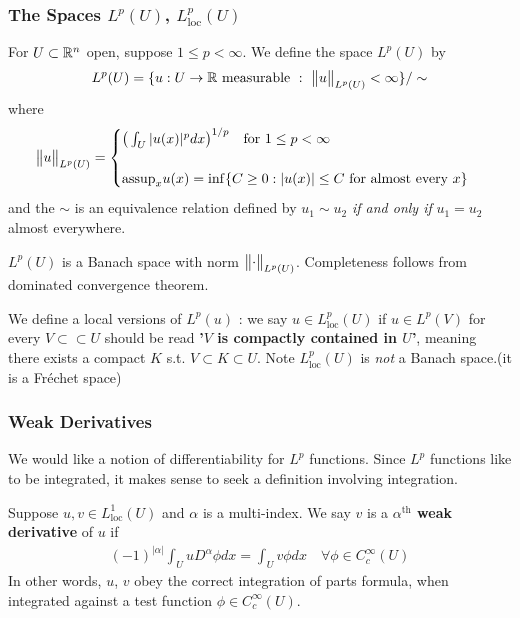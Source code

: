 \documentclass[10pt,a4paper]{report}
\begin{document}
\subsubsection*{The Spaces $L^p(U)$, $L^p_{\text{loc}}(U)$}

For $U\subset\mathbb{R}^n$ open, suppose $1\leq p<\infty$. We define the space $L^p(U)$ by
\begin{align*}
L^p(U) = \{ u:U\rightarrow \mathbb{R} \text{ measurable} \,\, : \,\, \bigl\lVert u\bigr\rVert_{L^p(U)} <\infty \} / \sim
\end{align*}
where
\begin{align*}
\bigl\lVert u\bigr\rVert_{L^p(U)} = \begin{cases}
\big( \int_{U} |u(x)|^p dx \big)^{1/p} \quad \text{for } 1\leq p <\infty \\
\\
\text{assup}_x u(x) = \inf \{C\geq 0 : |u(x)| \leq C \text{ for almost every } x \}
\end{cases}
\end{align*}
and the $\sim$ is an equivalence relation defined by $u_1 \sim u_2$ \emph{if and only if} $u_1 = u_2$ almost everywhere.

$L^p(U)$ is a Banach space with norm $\bigl\lVert\cdot\bigr\rVert_{L^p(U)}$. Completeness follows from dominated convergence theorem.
\s

We define a local versions of $L^p(u)$ : we say $u\in L^p_{\text{loc}}(U)$ if $u\in L^p(V)$ for every $V \subset\subset U$ should be read \textbf{'$V$ is compactly contained in $U$'}, meaning there exists a compact $K$ s.t. $V\subset K \subset U$. Note $L^p_{\text{loc}}(U)$ is \emph{not} a Banach space.(it is a Fr\'{e}chet space)

\subsubsection*{Weak Derivatives}

We would like a notion of differentiability for $L^p$ functions. Since $L^p$ functions like to be integrated, it makes sense to seek a definition involving integration.
\s

 Suppose $u,v\in L^1_{\text{loc}}(U)$ and $\alpha$ is a multi-index. We say $v$ is a \textbf{$\alpha^{\text{th}}$ weak derivative} of $u$ if
\begin{align*}
(-1)^{|\alpha|} \int_{U} uD^{\alpha} \phi dx = \int_U v\phi dx \quad \forall \phi \in C^{\infty}_c(U)
\end{align*}
In other words, $u$, $v$ obey the correct integration of parts formula, when integrated against a test function $\phi \in C^{\infty}_c(U)$.
\s
\end{document}
